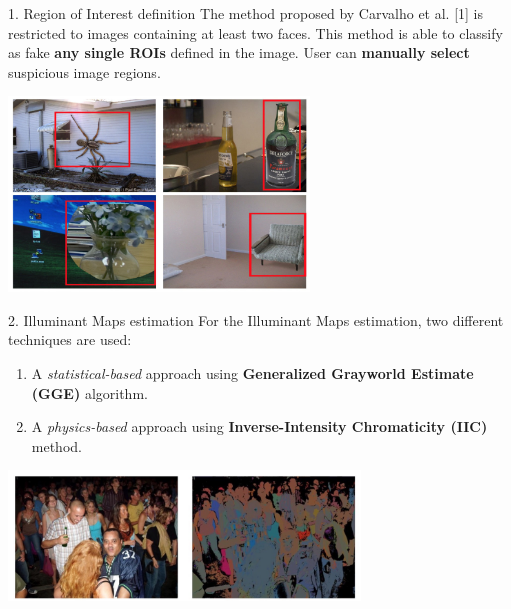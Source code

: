 \begin{tframe}{1. Region of Interest definition}
The method proposed by Carvalho et al. [1] is restricted to images containing at least two faces. This method is able to classify as fake \textbf{any single ROIs} defined in the image.
\vspace{0.2cm}
User can \textbf{manually select} suspicious image regions.
\vspace{0.2cm}
\begin{center}
\includegraphics[width=0.6\textwidth]{images/rois.jpg}
\end{center}
\end{tframe}

\begin{tframe}{2. Illuminant Maps estimation}
\vspace{0.2cm}
For the Illuminant Maps estimation, two different techniques are used: 
\vspace{0.3cm}
\begin{enumerate}
\item A \emph{statistical-based} approach using \textbf{Generalized Grayworld Estimate (GGE)} algorithm.
\vspace{0.2cm}
\item A \emph{physics-based} approach using \textbf{Inverse-Intensity Chromaticity (IIC)} method.
\end{enumerate}

\begin{center}
\includegraphics[width=0.7\textwidth]{images/riess.jpg}
\end{center}
\end{tframe}


